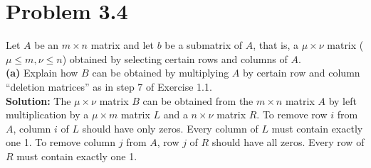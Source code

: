 \documentclass{article}
\begin{document}
\pagebreak
\section*{Problem 3.4}
Let $A$ be an $m \times n$ matrix and let $b$ be a submatrix of $A$, that is, a $\mu \times \nu$ matrix ($\mu \leq m, \nu \leq n$) obtained by selecting certain rows and columns of $A$. \\

\textbf{(a)} Explain how $B$ can be obtained by multiplying $A$ by certain row and column ``deletion matrices'' as in step 7 of Exercise 1.1. \\

\textbf{Solution:} The $\mu \times \nu$ matrix $B$ can be obtained from the $m \times n$ matrix $A$ by left multiplication by a $\mu \times m$ matrix $L$ and a $n \times \nu$ matrix $R$. To remove row $i$ from $A$, column $i$ of $L$ should have only zeros. Every column of $L$ must contain exactly one 1. To remove column $j$ from $A$, row $j$ of $R$ should have all zeros. Every row of $R$ must contain exactly one 1.\\
\end{document}
